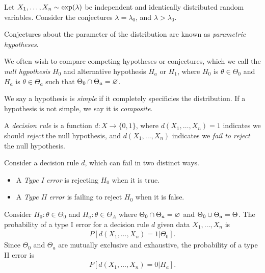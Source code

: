 \begin{exmp}
    Let $X_1, \ldots, X_n \sim \textrm{exp}(\lambda)$ be independent and identically distributed random variables. Consider the conjectures $\lambda = \lambda_{0}$, and $\lambda > \lambda_{0}$.
\end{exmp}

Conjectures about the parameter of the distribution are known as \emph{parametric hypotheses}.

We often wish to compare competing hypotheses or conjectures, which we call the \emph{null hypothesis} $H_0$ and alternative hypothesis $H_a$ or $H_1$, where $H_0$ is $\theta \in \Theta_0$ and $H_a$ is $\theta \in \Theta_a$ such that $\Theta_0 \cap \Theta_a = \varnothing$.

We say a hypothesis is \emph{simple} if it completely specificies the distribution. If a hypothesis is not simple, we say it is \emph{composite}.

\begin{defn}
    A \emph{decision rule} is a function $d: X \to \{0, 1\}$, where $d(X_1, \ldots, X_n) = 1$ indicates we should \emph{reject} the null hypothesis, and $d(X_1, \ldots, X_n)$ indicates we \emph{fail to reject} the null hypothesis.
\end{defn}

\begin{defn}
    Consider a decision rule $d$, which can fail in two distinct ways.
    \begin{itemize}
        \item A \emph{Type I error} is rejecting $H_0$ when it is true.
        \item A \emph{Type II error} is failing to reject $H_0$ when it is false.
    \end{itemize}
\end{defn}

\begin{exmp}
    Consider $H_0: \theta \in \Theta_0$ and $H_a: \theta \in \Theta_A$ where $\Theta_0 \cap \Theta_a = \varnothing$ and $\Theta_0 \cup \Theta_a = \Theta$. The probability of a type I error for a decision rule $d$ given data $X_1, \ldots, X_n$ is
    \begin{align*}
        P\left[d(X_1, \ldots, X_n) = 1 | \Theta_0\right].
    \end{align*}
    Since $\Theta_0$ and $\Theta_a$ are mutually exclusive and exhaustive, the probability of a type II error is
    \begin{align*}
        P\left[d(X_1, \ldots, X_n) = 0|H_a\right].
    \end{align*}
\end{exmp}

